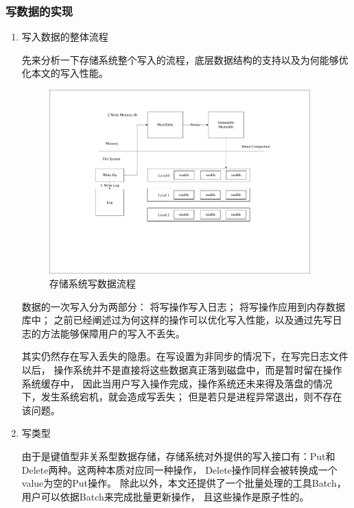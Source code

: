 		\subsubsection{写数据的实现}
		
		\begin{enumerate}
		\item 写入数据的整体流程
			
		先来分析一下存储系统整个写入的流程，底层数据结构的支持以及为何能够优化本文的写入性能。
		
		\begin{figure}[H]
			\centering
			\includegraphics[width=0.95\textwidth]{pdf/write_op.pdf}
			\caption{存储系统写数据流程}
			\label{write_op}
		\end{figure}

		数据的一次写入分为两部分：
		将写操作写入日志；
		将写操作应用到内存数据库中；
		之前已经阐述过为何这样的操作可以优化写入性能，以及通过先写日志的方法能够保障用户的写入不丢失。
		
		其实仍然存在写入丢失的隐患。在写设置为非同步的情况下，在写完日志文件以后，
		操作系统并不是直接将这些数据真正落到磁盘中，而是暂时留在操作系统缓存中，
		因此当用户写入操作完成，操作系统还未来得及落盘的情况下，发生系统宕机，就会造成写丢失；
		但是若只是进程异常退出，则不存在该问题。

		\item 写类型
		
		由于是键值型非关系型数据存储，存储系统对外提供的写入接口有：Put和Delete两种。这两种本质对应同一种操作，
		Delete操作同样会被转换成一个value为空的Put操作。
		除此以外，本文还提供了一个批量处理的工具Batch，用户可以依据Batch来完成批量更新操作，
		且这些操作是原子性的。


\end{enumerate}

